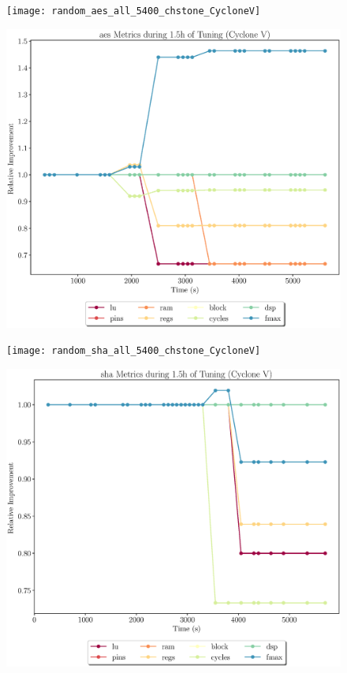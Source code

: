 \documentclass[12pt, a4paper]{article}
\begin{document}
\newpage

\begin{figure}[htpb]
    \centering
    \begin{minipage}{.48\textwidth}
        \centering
        \texttt{[image: random\_aes\_all\_5400\_chstone\_CycloneV]}
    \end{minipage}%
    \hfill
    \begin{minipage}{.48\textwidth}
        \centering
        \includegraphics[scale=.25]{aes_all_5400_chstone_CycloneV}
    \end{minipage}%

    \begin{minipage}{.48\textwidth}
        \texttt{[image: random\_sha\_all\_5400\_chstone\_CycloneV]}
    \end{minipage}%
    \hfill
    \begin{minipage}{.48\textwidth}
        \includegraphics[scale=.25]{sha_all_5400_chstone_CycloneV}
    \end{minipage}%


\end{figure}
\end{document}
